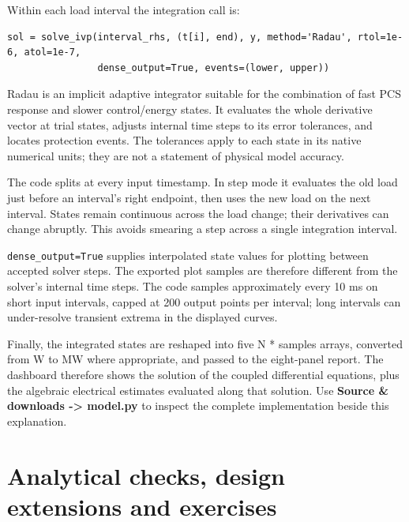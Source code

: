 \documentclass[11pt,a4paper]{article}
\begin{document}
Within each load interval the integration call is:

\begin{lstlisting}
sol = solve_ivp(interval_rhs, (t[i], end), y, method='Radau', rtol=1e-6, atol=1e-7,
                dense_output=True, events=(lower, upper))
\end{lstlisting}

Radau is an implicit adaptive integrator suitable for the combination of fast PCS response and slower control/energy states. It evaluates the whole derivative vector at trial states, adjusts internal time steps to its error tolerances, and locates protection events. The tolerances apply to each state in its native numerical units; they are not a statement of physical model accuracy.

The code splits at every input timestamp. In step mode it evaluates the old load just before an interval's right endpoint, then uses the new load on the next interval. States remain continuous across the load change; their derivatives can change abruptly. This avoids smearing a step across a single integration interval.

\texttt{dense\_output=True} supplies interpolated state values for plotting between accepted solver steps. The exported plot samples are therefore different from the solver's internal time steps. The code samples approximately every 10 ms on short input intervals, capped at 200 output points per interval; long intervals can under-resolve transient extrema in the displayed curves.

Finally, the integrated states are reshaped into five N  *  samples arrays, converted from W to MW where appropriate, and passed to the eight-panel report. The dashboard therefore shows the solution of the coupled differential equations, plus the algebraic electrical estimates evaluated along that solution. Use \textbf{Source \& downloads  ->  model.py} to inspect the complete implementation beside this explanation.
\clearpage
\part{Analytical checks, design extensions and exercises}
\end{document}
